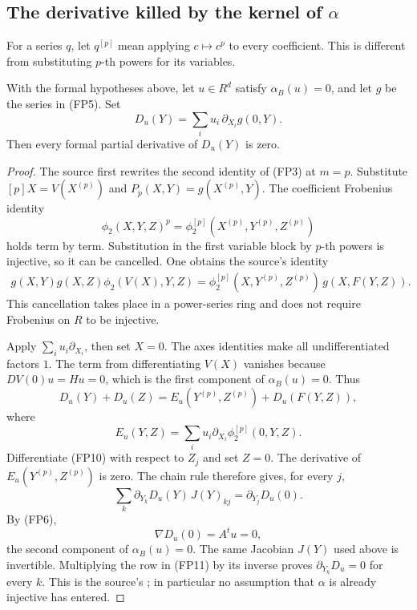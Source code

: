 \subsection{The derivative killed by the kernel of \(\alpha\)}
\label{subsec:faithful-alpha-kernel-derivative}

For a series \(q\), let \(q^{[p]}\) mean applying
\(c\mapsto c^p\) to every coefficient.
This is different from substituting \(p\)-th powers
for its variables.

\begin{srlemma}\label{lem:faithful-alpha-kernel-derivative}
With the formal hypotheses above, let \(u\in R^d\) satisfy
\(\alpha_B(u)=0\), and let \(g\) be the series in (FP5).
Set
\[
                       D_u(Y)=
                       \sum_i u_i\,\partial_{X_i}g(0,Y).
 \tag{FP8}\label{eq:faithful-Du}
\]
Then every formal partial derivative of \(D_u(Y)\) is zero.
\end{srlemma}
\begin{proof}
The source first rewrites the second identity of (FP3)
at \(m=p\).
Substitute \([p]X=V(X^{(p)})\) and
\(P_p(X,Y)=g(X^{(p)},Y)\).
The coefficient Frobenius identity
\[
                 \phi_2(X,Y,Z)^p
                   =\phi_2^{[p]}(X^{(p)},Y^{(p)},Z^{(p)})
\]
holds term by term.
Substitution in the first variable block by \(p\)-th
powers is injective, so it can be cancelled.
One obtains the source's identity
\[
 \begin{split}
 g(X,Y)g(X,Z)\phi_2(V(X),Y,Z)
  =\phi_2^{[p]}(X,Y^{(p)},Z^{(p)})\,g(X,F(Y,Z)).
 \end{split}
 \tag{FP9}\label{eq:faithful-germKill-identity}
\]
This cancellation takes place in a power-series ring
and does not require Frobenius on \(R\) to be injective.

Apply \(\sum_i u_i\partial_{X_i}\), then set \(X=0\).
The axes identities make all undifferentiated factors \(1\).
The term from differentiating \(V(X)\) vanishes because
\(DV(0)u=Hu=0\), which is the first component of
\(\alpha_B(u)=0\).
Thus
\[
 D_u(Y)+D_u(Z)
   =E_u(Y^{(p)},Z^{(p)})+D_u(F(Y,Z)),
 \tag{FP10}\label{eq:faithful-germKill-additive}
\]
where
\[
             E_u(Y,Z)=
                 \sum_i u_i\partial_{X_i}
                                      \phi_2^{[p]}(0,Y,Z).
\]
Differentiate (FP10) with respect to \(Z_j\) and set \(Z=0\).
The derivative of \(E_u(Y^{(p)},Z^{(p)})\) is zero.
The chain rule therefore gives, for every \(j\),
\[
   \sum_k\partial_{Y_k}D_u(Y)\,J(Y)_{kj}
                                =\partial_{Y_j}D_u(0).
 \tag{FP11}\label{eq:faithful-germKill-Jacobian}
\]
By (FP6),
\[
                         \nabla D_u(0)=A^tu=0,
\]
the second component of \(\alpha_B(u)=0\).
The same Jacobian \(J(Y)\) used above is invertible.
Multiplying the row in (FP11) by its inverse proves
\(\partial_{Y_k}D_u=0\) for every \(k\).
This is the source's ; in particular no
assumption that \(\alpha\) is already injective has entered.
\end{proof}


